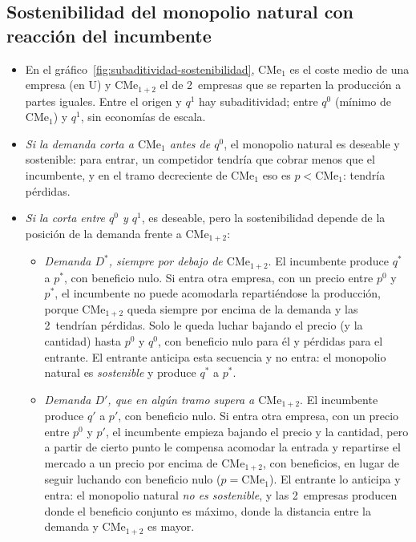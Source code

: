 \documentclass[11pt]{article}
\begin{document}
\subsection{Sostenibilidad del monopolio natural con reacción del incumbente}\label{anexo:sostenibilidad}

\begin{itemize}
\item En el gráfico~\ref{fig:subaditividad-sostenibilidad}, $\mathrm{CMe}_1$ es el coste medio de una empresa (en U) y $\mathrm{CMe}_{1+2}$ el de 2~empresas que se reparten la producción a partes iguales. Entre el origen y $q^1$ hay subaditividad; entre $q^0$ (mínimo de $\mathrm{CMe}_1$) y $q^1$, sin economías de escala.
\item \emph{Si la demanda corta a $\mathrm{CMe}_1$ antes de $q^0$}, el monopolio natural es deseable y sostenible: para entrar, un competidor tendría que cobrar menos que el incumbente, y en el tramo decreciente de $\mathrm{CMe}_1$ eso es $p<\mathrm{CMe}_1$: tendría pérdidas.
\item \emph{Si la corta entre $q^0$ y $q^1$}, es deseable, pero la sostenibilidad depende de la posición de la demanda frente a $\mathrm{CMe}_{1+2}$:
  \begin{itemize}
  \item \emph{Demanda $D^{*}$, siempre por debajo de $\mathrm{CMe}_{1+2}$}. El incumbente produce $q^{*}$ a $p^{*}$, con beneficio nulo. Si entra otra empresa, con un precio entre $p^0$ y $p^{*}$, el incumbente no puede acomodarla repartiéndose la producción, porque $\mathrm{CMe}_{1+2}$ queda siempre por encima de la demanda y las 2~tendrían pérdidas. Solo le queda luchar bajando el precio (y la cantidad) hasta $p^0$ y $q^0$, con beneficio nulo para él y pérdidas para el entrante. El entrante anticipa esta secuencia y no entra: el monopolio natural es \emph{sostenible} y produce $q^{*}$ a $p^{*}$.
  \item \emph{Demanda $D'$, que en algún tramo supera a $\mathrm{CMe}_{1+2}$}. El incumbente produce $q'$ a $p'$, con beneficio nulo. Si entra otra empresa, con un precio entre $p^0$ y $p'$, el incumbente empieza bajando el precio y la cantidad, pero a partir de cierto punto le compensa acomodar la entrada y repartirse el mercado a un precio por encima de $\mathrm{CMe}_{1+2}$, con beneficios, en lugar de seguir luchando con beneficio nulo ($p=\mathrm{CMe}_1$). El entrante lo anticipa y entra: el monopolio natural \emph{no es sostenible}, y las 2~empresas producen donde el beneficio conjunto es máximo, donde la distancia entre la demanda y $\mathrm{CMe}_{1+2}$ es mayor.\findemo

\end{itemize}
\end{itemize}
\end{document}
